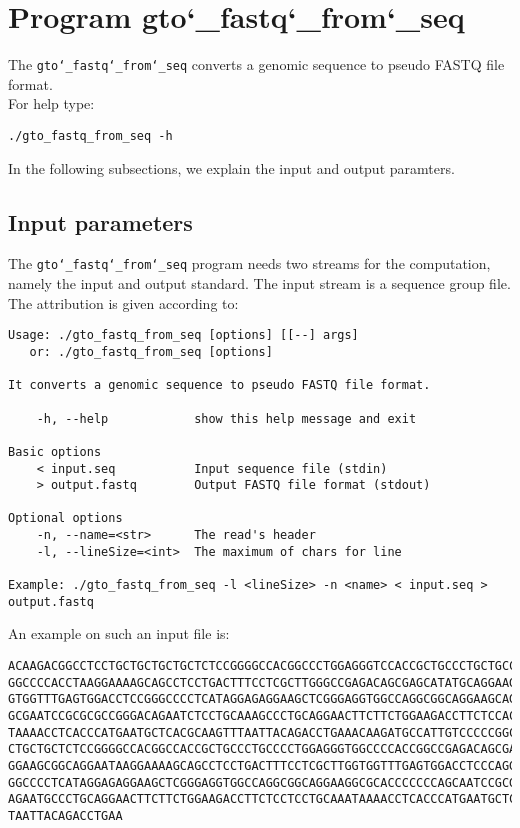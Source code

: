 \section{Program gto\char`_fastq\char`_from\char`_seq}
The \texttt{gto\char`_fastq\char`_from\char`_seq} converts a genomic sequence to pseudo FASTQ file format.\\
For help type:
\begin{lstlisting}
./gto_fastq_from_seq -h
\end{lstlisting}
In the following subsections, we explain the input and output paramters.

\subsection*{Input parameters}

The \texttt{gto\char`_fastq\char`_from\char`_seq} program needs two streams for the computation, namely the input and output standard. The input stream is a sequence group file.\\
The attribution is given according to:
\begin{lstlisting}
Usage: ./gto_fastq_from_seq [options] [[--] args]
   or: ./gto_fastq_from_seq [options]

It converts a genomic sequence to pseudo FASTQ file format.

    -h, --help            show this help message and exit

Basic options
    < input.seq           Input sequence file (stdin)
    > output.fastq        Output FASTQ file format (stdout)

Optional options
    -n, --name=<str>      The read's header
    -l, --lineSize=<int>  The maximum of chars for line

Example: ./gto_fastq_from_seq -l <lineSize> -n <name> < input.seq > output.fastq
\end{lstlisting}
An example on such an input file is:
\begin{lstlisting}
ACAAGACGGCCTCCTGCTGCTGCTGCTCTCCGGGGCCACGGCCCTGGAGGGTCCACCGCTGCCCTGCTGCCATTGTCCCC
GGCCCCACCTAAGGAAAAGCAGCCTCCTGACTTTCCTCGCTTGGGCCGAGACAGCGAGCATATGCAGGAAGCGGCAGGAA
GTGGTTTGAGTGGACCTCCGGGCCCCTCATAGGAGAGGAAGCTCGGGAGGTGGCCAGGCGGCAGGAAGCAGGCCAGTGCC
GCGAATCCGCGCGCCGGGACAGAATCTCCTGCAAAGCCCTGCAGGAACTTCTTCTGGAAGACCTTCTCCACCCCCCCAGC
TAAAACCTCACCCATGAATGCTCACGCAAGTTTAATTACAGACCTGAAACAAGATGCCATTGTCCCCCGGCCTCCTGCTG
CTGCTGCTCTCCGGGGCCACGGCCACCGCTGCCCTGCCCCTGGAGGGTGGCCCCACCGGCCGAGACAGCGAGCATATGCA
GGAAGCGGCAGGAATAAGGAAAAGCAGCCTCCTGACTTTCCTCGCTTGGTGGTTTGAGTGGACCTCCCAGGCCAGTGCCG
GGCCCCTCATAGGAGAGGAAGCTCGGGAGGTGGCCAGGCGGCAGGAAGGCGCACCCCCCCAGCAATCCGCGCGCCGGGAC
AGAATGCCCTGCAGGAACTTCTTCTGGAAGACCTTCTCCTCCTGCAAATAAAACCTCACCCATGAATGCTCACGCAAGTT
TAATTACAGACCTGAA
\end{lstlisting}

